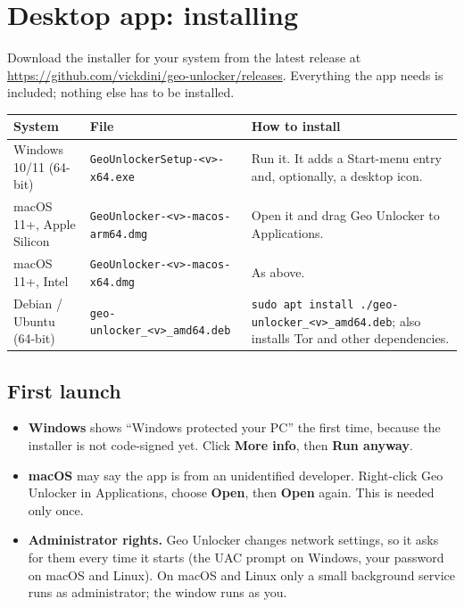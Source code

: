 \documentclass[11pt,a4paper]{article}
\newcommand{\ui}[1]{\textbf{#1}}            %
\newcommand{\file}[1]{\texttt{#1}}          %
\begin{document}
\section{Desktop app: installing}

Download the installer for your system from the latest release at \url{https://github.com/vickdini/geo-unlocker/releases}. Everything the app needs is included; nothing else has to be installed.

\begin{center}\small
\begin{tabularx}{\linewidth}{@{}>{\raggedright\arraybackslash}p{2.9cm} l L@{}}
\toprule
\textbf{System} & \textbf{File} & \textbf{How to install} \\
\midrule
Windows 10/11 (64-bit) & \file{GeoUnlockerSetup-<v>-x64.exe} & Run it. It adds a Start-menu entry and, optionally, a desktop icon. \\
macOS 11+, Apple Silicon & \file{GeoUnlocker-<v>-macos-arm64.dmg} & Open it and drag Geo Unlocker to Applications. \\
macOS 11+, Intel & \file{GeoUnlocker-<v>-macos-x64.dmg} & As above. \\
Debian / Ubuntu (64-bit) & \file{geo-unlocker\_<v>\_amd64.deb} & \file{sudo apt install ./geo-unlocker\_<v>\_amd64.deb}; also installs Tor and other dependencies. \\
\bottomrule
\end{tabularx}
\end{center}

\subsection{First launch}

\begin{itemize}
  \item \textbf{Windows} shows ``Windows protected your PC'' the first time, because the installer is not code-signed yet. Click \ui{More info}, then \ui{Run anyway}.
  \item \textbf{macOS} may say the app is from an unidentified developer. Right-click Geo Unlocker in Applications, choose \ui{Open}, then \ui{Open} again. This is needed only once.
  \item \textbf{Administrator rights.} Geo Unlocker changes network settings, so it asks for them every time it starts (the UAC prompt on Windows, your password on macOS and Linux). On macOS and Linux only a small background service runs as administrator; the window runs as you.
\end{itemize}
\end{document}
